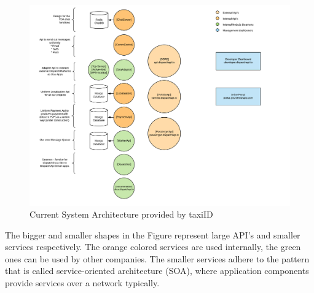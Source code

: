 \begin{figure}[H]
	\centering
	\includegraphics[width=1\textwidth]{Architecture}
	\caption[Current System Architecture]{Current System Architecture provided by taxiID}
	\label{fig:Architecture}
\end{figure}

The bigger and smaller shapes in the Figure represent large API's and smaller services respectively. The orange colored services are used internally, the green ones can be used by other companies. The smaller services adhere to the pattern that is called service-oriented architecture (SOA), where application components provide services over a network typically.

